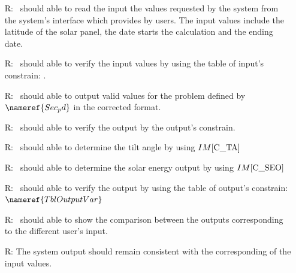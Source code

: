 \documentclass[12pt]{article}
\newcommand{\iref}[1]{IM\ref{#1}}
\newcounter{reqnum} %
\begin{document}
\noindent \begin{itemize}

\item[R\refstepcounter{reqnum}\thereqnum \label{R_Inputs}:] \progname~should able to read the input the values 
requested by the system from the
system's interface which provides by users. The input values include
the latitude of the solar panel, the date starts the calculation and the ending date.\\

\item[R\refstepcounter{reqnum}\thereqnum \label{R_Inputs}:]\progname~should able to verify the input values by using the 
table of input's constrain: . \\


\item[R\refstepcounter{reqnum}\thereqnum \label{R_OutputInputs}:] \progname~should able to output valid values for the problem defined by $\nameref{Sec_pd} $ in the corrected format.\\


\item[R\refstepcounter{reqnum}\thereqnum \label{R_OutputInputs}:] \progname~should able to verify the output by the output's constrain. \\


\item[R\refstepcounter{reqnum}\thereqnum \label{R_Calculate}:] \progname~should able to determine the tilt angle by using $\iref{C_TA}$\\

\item[R\refstepcounter{reqnum}\thereqnum \label{R_Calculate}:] \progname~should able to determine the solar energy output by 
using $\iref{C_SEO}$\\


\item[R\refstepcounter{reqnum}\thereqnum \label{R_VerifyOutput}:] 
\progname~should able to verify the output by using the table of output's constrain: $\nameref{TblOutputVar}$\\




\item[R\refstepcounter{reqnum}\thereqnum \label{R_Outputshowt}:] \progname~should able to show the comparison
between the outputs corresponding to the different user's input.\\

\item[R\refstepcounter{reqnum}\thereqnum \label{R_Outputconsist}:]
The system output should remain consistent with
the corresponding of the input values.


\end{itemize}
\end{document}

